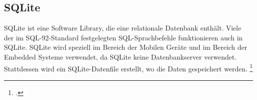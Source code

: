
\subsection{SQLite}
SQLite ist eine Software Library, die eine relationale Datenbank enthält. Viele der im SQL-92-Standard festgelegten SQL-Sprachbefehle funktionieren auch in SQLite. SQLite wird speziell im Bereich der Mobilen Geräte und im Bereich der Embedded Systeme verwendet, da SQLite keine Datenbankserver verwendet. Stattdessen wird ein SQLite-Datenfile erstellt, wo die Daten gespeichert werden. \footcite[vgl.][]{sqlite}


